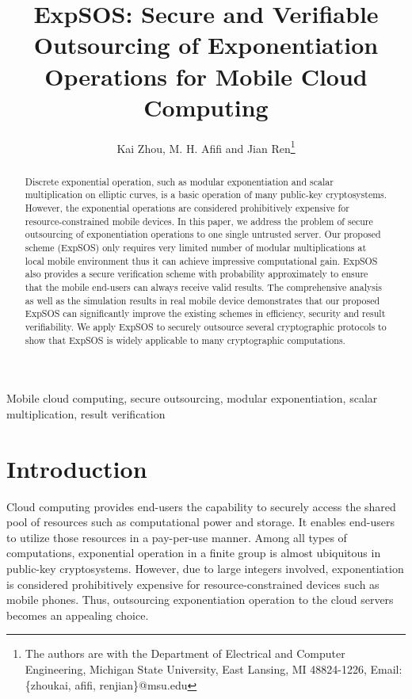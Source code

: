 \documentclass[english,draftcls,onecolumn,11pt]{IEEEtran}
\theoremstyle{definition}
\theoremstyle{plain}
\theoremstyle{plain}
\theoremstyle{definition}
\begin{document}
\title{ExpSOS: Secure and Verifiable Outsourcing of Exponentiation Operations
for Mobile Cloud Computing}


\author{Kai Zhou, M. H. Afifi and Jian Ren\thanks{The authors are with the Department of Electrical and Computer Engineering,
Michigan State University, East Lansing, MI 48824-1226, Email: \{zhoukai,
afifi, renjian\}@msu.edu}}
\maketitle
\begin{abstract}
Discrete exponential operation, such as modular exponentiation and
scalar multiplication on elliptic curves, is a basic operation of
many public-key cryptosystems. However, the exponential operations
are considered prohibitively expensive for resource-constrained mobile
devices. In this paper, we address the problem of secure outsourcing
of exponentiation operations to one single untrusted server. Our proposed
scheme (ExpSOS) only requires very limited number of modular multiplications
at local mobile environment thus it can achieve impressive computational
gain. ExpSOS also provides a secure verification scheme with probability
approximately  to ensure that the mobile end-users can always
receive valid results. The comprehensive analysis as well as the simulation
results in real mobile device demonstrates that our proposed ExpSOS
can significantly improve the existing schemes in efficiency, security
and result verifiability. We apply ExpSOS to securely outsource several
cryptographic protocols to show that ExpSOS is widely applicable to
many cryptographic computations.\end{abstract}

\begin{IEEEkeywords}
Mobile cloud computing, secure outsourcing, modular exponentiation,
scalar multiplication, result verification
\end{IEEEkeywords}


\section{Introduction}

Cloud computing provides end-users the capability to securely access
the shared pool of resources such as computational power and storage.
It enables end-users to utilize those resources in a pay-per-use manner.
Among all types of computations, exponential operation in a finite
group is almost ubiquitous in public-key cryptosystems. However, due
to large integers involved, exponentiation is considered prohibitively
expensive for resource-constrained devices such as mobile phones.
Thus, outsourcing exponentiation operation to the cloud servers becomes
an appealing choice. 
\end{document}

